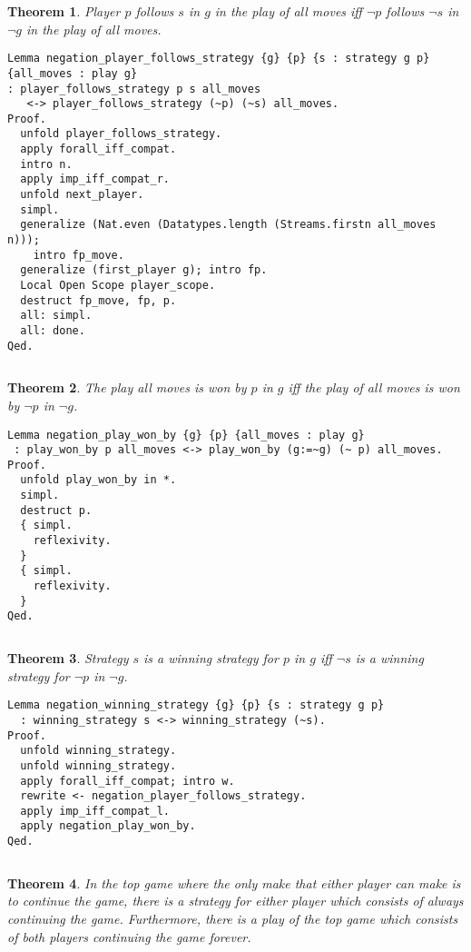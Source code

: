 \documentclass{article}
\newtheorem{thm}{Theorem}
\theoremstyle{definition}
\begin{document}
\begin{thm}
Player $p$ follows  $s$ in   $g$ in the play of all moves iff  $\neg p$ follows  $\neg s$ in  $\neg g$ in the play of all moves.
\end{thm}

\begin{verbatim}
Lemma negation_player_follows_strategy {g} {p} {s : strategy g p} {all_moves : play g} 
: player_follows_strategy p s all_moves
   <-> player_follows_strategy (~p) (~s) all_moves.
Proof.
  unfold player_follows_strategy.
  apply forall_iff_compat.
  intro n.
  apply imp_iff_compat_r.
  unfold next_player.
  simpl.
  generalize (Nat.even (Datatypes.length (Streams.firstn all_moves n)));
    intro fp_move.
  generalize (first_player g); intro fp.
  Local Open Scope player_scope.
  destruct fp_move, fp, p.
  all: simpl.
  all: done.
Qed.
\end{verbatim}
 $\left.\right.$
\begin{thm}
The play all moves is won by $p$ in $g$ iff the play of all moves is won by $\neg p$ in $\neg g$.
\end{thm}

\begin{verbatim}
Lemma negation_play_won_by {g} {p} {all_moves : play g}
 : play_won_by p all_moves <-> play_won_by (g:=~g) (~ p) all_moves.
Proof.
  unfold play_won_by in *.
  simpl.
  destruct p.
  { simpl.
    reflexivity.
  }
  { simpl.
    reflexivity.
  }
Qed.
\end{verbatim}

$\left.\right.$

\begin{thm}
Strategy $s$ is a winning strategy for $p$ in $g$ iff $\neg s$ is a winning strategy for $\neg p$ in $\neg g$. 
\end{thm}

\begin{verbatim}
Lemma negation_winning_strategy {g} {p} {s : strategy g p}
  : winning_strategy s <-> winning_strategy (~s).
Proof.
  unfold winning_strategy.
  unfold winning_strategy.
  apply forall_iff_compat; intro w.
  rewrite <- negation_player_follows_strategy.
  apply imp_iff_compat_l.
  apply negation_play_won_by.
Qed.
\end{verbatim}

$\left.\right.$

\begin{thm}
In the top game where the only make that either player can make is to continue the game, there is a strategy for either player which consists of always continuing the game. Furthermore, there is a play of the top game which consists of both players continuing the game forever. 
\end{thm}
\end{document}
